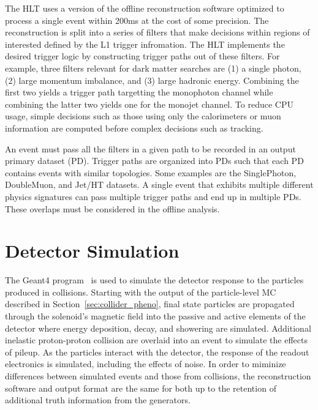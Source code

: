 The HLT uses a version of the offline reconstruction software optimized to process a single event within 200\unit{ms} at the cost of some precision.
The reconstruction is split into a series of filters that make decisions within regions of interested defined by the L1 trigger infromation.
The HLT implements the desired trigger logic by constructing trigger paths out of these filters.
For example, three filters relevant for dark matter searches are (1) a single photon, (2) large momentum imbalance, and (3) large hadronic energy.
Combining the first two yields a trigger path targetting the monophoton channel while combining the latter two yields one for the monojet channel.
To reduce CPU usage, simple decisions such as those using only the calorimeters or muon information are computed before complex decisions such as tracking.

An event must pass all the filters in a given path to be recorded in an output primary dataset (PD).
Trigger paths are organized into PDs such that each PD contains events with similar topologies.
Some examples are the SinglePhoton, DoubleMuon, and Jet/HT datasets. 
A single event that exhibits multiple different physics signatures can pass multiple trigger paths and end up in multiple PDs.
These overlaps must be considered in the offline analysis.

\section{Detector Simulation}

The Geant4 program~\cite{Geant2003, Geant2006} is used to simulate the detector response to the particles produced in collisions.
Starting with the output of the particle-level MC described in Section~\ref{sec:collider_pheno}, final state particles are propagated through the solenoid's magnetic field into the passive and active elements of the detector where energy deposition, decay, and showering are simulated.
Additional inelastic proton-proton collision are overlaid into an event to simulate the effects of pileup.
As the particles interact with the detector, the response of the readout electronics is simulated, including the effects of noise.
In order to miminize differences between simulated events and those from collisions, the reconstruction software and output format are the same for both up to the retention of additional truth information from the generators.
